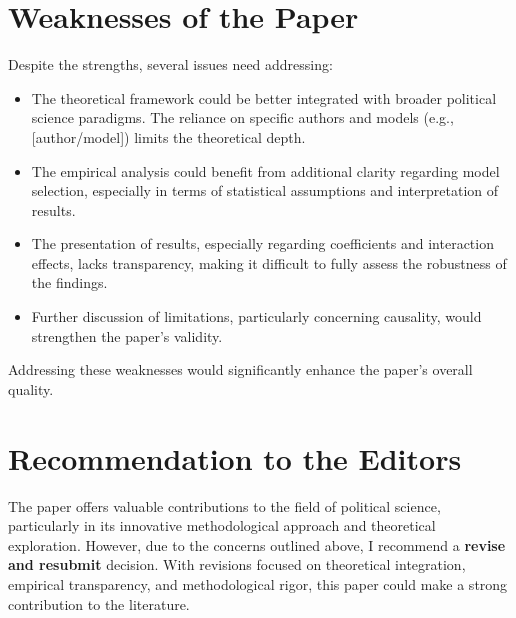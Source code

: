 \documentclass[11pt,a4paper]{article}
\begin{document}
\begin{multicols}{2}
\section{Weaknesses of the Paper}
Despite the strengths, several issues need addressing:
\begin{itemize}
    \item The theoretical framework could be better integrated with broader political science paradigms. The reliance on specific authors and models (e.g., [author/model]) limits the theoretical depth.
    \item The empirical analysis could benefit from additional clarity regarding model selection, especially in terms of statistical assumptions and interpretation of results.
    \item The presentation of results, especially regarding coefficients and interaction effects, lacks transparency, making it difficult to fully assess the robustness of the findings.
    \item Further discussion of limitations, particularly concerning causality, would strengthen the paper's validity.
\end{itemize}
Addressing these weaknesses would significantly enhance the paper's overall quality.


\section{Recommendation to the Editors}
The paper offers valuable contributions to the field of political science, particularly in its innovative methodological approach and theoretical exploration. However, due to the concerns outlined above, I recommend a \textbf{revise and resubmit} decision. With revisions focused on theoretical integration, empirical transparency, and methodological rigor, this paper could make a strong contribution to the literature.

\end{multicols}

\newpage

\printbibliography[title=Bibliography]
\end{document}
